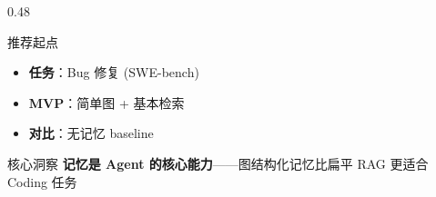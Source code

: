 \documentclass[aspectratio=169,10pt]{beamer}
\begin{document}
\begin{frame}
\begin{columns}[T]
\begin{column}{0.48\textwidth}
      \vspace{0.2cm}

      \begin{block}{推荐起点}
        \footnotesize
        \begin{itemize}
          \item \textbf{任务}：Bug 修复 (SWE-bench)
          \item \textbf{MVP}：简单图 + 基本检索
          \item \textbf{对比}：无记忆 baseline
        \end{itemize}
      \end{block}

      \vspace{0.2cm}

      \begin{alertblock}{核心洞察}
        \tiny
        \textbf{记忆是 Agent 的核心能力}——图结构化记忆比扁平 RAG 更适合 Coding 任务
      \end{alertblock}
    \end{column}
  \end{columns}
\end{frame}
\end{document}
